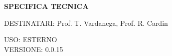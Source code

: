 \documentclass[5pt]{article}
\begin{document}
	\vspace{24pt}
	
	\begin{center}
		\textbf{\LARGE SPECIFICA TECNICA}
	\end{center}
	
	\vspace{13pt}
	
	\begin{flushleft}
		\begin{spacing}{1.5}
			DESTINATARI: Prof. T. Vardanega, Prof. R. Cardin\\%
		\end{spacing}
	\end{flushleft}
	
	\begin{flushright}
		\begin{spacing}{1}
			USO: ESTERNO\\
			VERSIONE: 0.0.15\\
		\end{spacing}
	\end{flushright}
	
	
	\restoregeometry
	
	\pagebreak
	
\end{document}
